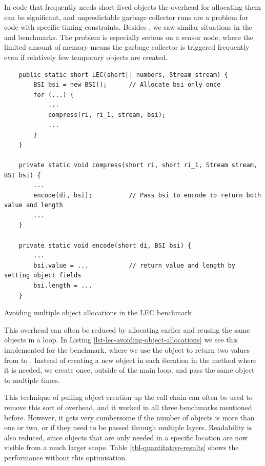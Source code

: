 In code that frequently needs short-lived objects the overhead for allocating them can be significant, and unpredictable garbage collector runs are a problem for code with specific timing constraints. Besides , we saw similar situations in the  and  benchmarks. The problem is especially serious on a sensor node, where the limited amount of memory means the garbage collector is triggered frequently even if relatively few temporary objects are created.

\begin{listing}
\begin{verbatim}
    public static short LEC(short[] numbers, Stream stream) {
        BSI bsi = new BSI();      // Allocate bsi only once
        for (...) {
            ...
            compress(ri, ri_1, stream, bsi);
            ...
        }
    }

    private static void compress(short ri, short ri_1, Stream stream, BSI bsi) {
        ...
        encode(di, bsi);          // Pass bsi to encode to return both value and length
        ...
    }

    private static void encode(short di, BSI bsi) {
        ...
        bsi.value = ...           // return value and length by setting object fields
        bsi.length = ...
    }
\end{verbatim}
\caption{Avoiding multiple object allocations in the LEC benchmark}
\label{lst-lec-avoiding-object-allocations}
\end{listing}

This overhead can often be reduced by allocating earlier and reusing the same objects in a loop. In Listing \ref{lst-lec-avoiding-object-allocations} we see this implemented for the  benchmark, where we use the  object to return two values from  to . Instead of creating a new object in each iteration in the  method where it is needed, we create  once, outside of the main loop, and pass the same object to  multiple times.

This technique of pulling object creation up the call chain can often be used to remove this sort of overhead, and it worked in all three benchmarks mentioned before. However, it gets very cumbersome if the number of objects is more than one or two, or if they need to be passed through multiple layers. Readability is also reduced, since objects that are only needed in a specific location are now visible from a much larger scope. Table \ref{tbl-quantitative-results} shows the performance without this optimisation.

